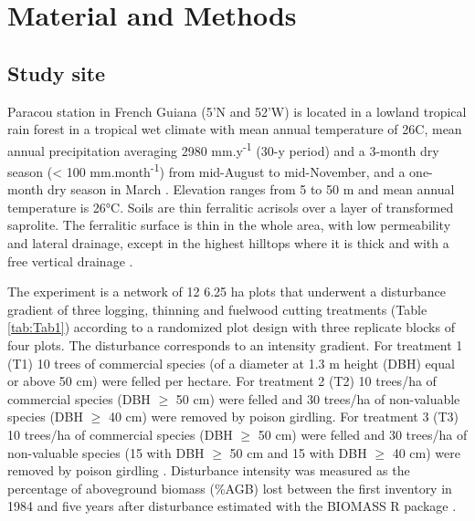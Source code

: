 \documentclass[fleqn,10pt]{ArtEcoFoG} %
\begin{document}
\section{Material and Methods}\label{material-and-methods}

\subsection{Study site}\label{study-site}

Paracou station in French Guiana (5'N and
52'W) is located in a lowland tropical rain forest in a
tropical wet climate with mean annual temperature of 26\textdegree C,
mean annual precipitation averaging 2980 mm.y\textsuperscript{-1} (30-y
period) and a 3-month dry season (\textless{} 100
mm.month\textsuperscript{-1}) from mid-August to mid-November, and a
one-month dry season in March \citep{Wagner2011}. Elevation ranges from
5 to 50 m and mean annual temperature is 26°C. Soils are thin ferralitic
acrisols over a layer of transformed saprolite. The ferralitic surface
is thin in the whole area, with low permeability and lateral drainage,
except in the highest hilltops where it is thick and with a free
vertical drainage \citep{Gourlet-Fleury2004}.

The experiment is a network of 12 6.25 ha plots that underwent a
disturbance gradient of three logging, thinning and fuelwood cutting
treatments (Table \ref{tab:Tab1}) according to a randomized plot design
with three replicate blocks of four plots. The disturbance corresponds
to an intensity gradient. For treatment 1 (T1) 10 trees of commercial
species (of a diameter at 1.3 m height (DBH) equal or above 50 cm) were
felled per hectare. For treatment 2 (T2) 10 trees/ha of commercial
species (DBH \(\geq\) 50 cm) were felled and 30 trees/ha of non-valuable
species (DBH \(\geq\) 40 cm) were removed by poison girdling. For
treatment 3 (T3) 10 trees/ha of commercial species (DBH \(\geq\) 50 cm)
were felled and 30 trees/ha of non-valuable species (15 with DBH
\(\geq\) 50 cm and 15 with DBH \(\geq\) 40 cm) were removed by poison
girdling \citep{Schmitt1990}. Disturbance intensity was measured as the
percentage of aboveground biomass (\%AGB) lost between the first
inventory in 1984 and five years after disturbance \citep{Piponiot2016}
estimated with the BIOMASS R package \citep{Biomass2018}.
\end{document}
